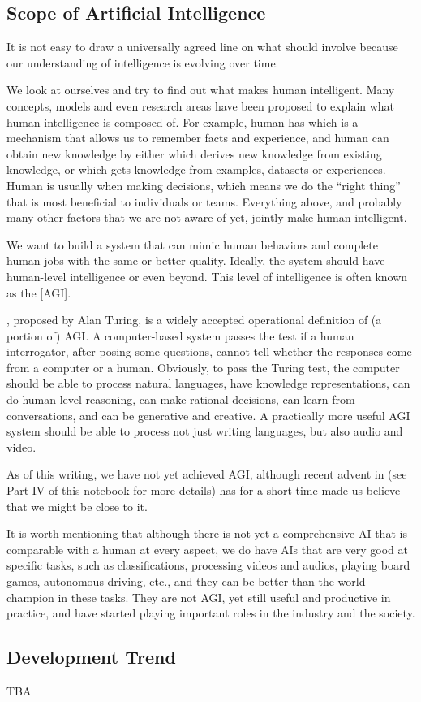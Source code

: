 \subsection{Scope of Artificial Intelligence}

It is not easy to draw a universally agreed line on what  should involve because our understanding of intelligence is evolving over time. 

We look at ourselves and try to find out what makes human intelligent. Many concepts, models and even research areas have been proposed to explain what human intelligence is composed of. For example, human has  which is a mechanism that allows us to remember facts and experience, and human can obtain new knowledge by either  which derives new knowledge from existing knowledge, or  which gets knowledge from examples, datasets or experiences. Human is usually  when making decisions, which means we do the ``right thing'' that is most beneficial to individuals or teams. Everything above, and probably many other factors that we are not aware of yet, jointly make human intelligent.

We want to build a system that can mimic human behaviors and complete human jobs with the same or better quality. Ideally, the system should have human-level intelligence or even beyond. This level of intelligence is often known as the [AGI]. 

, proposed by Alan Turing, is a widely accepted operational definition of (a portion of) AGI. A computer-based system passes the test if a human interrogator, after posing some questions, cannot tell whether the responses come from a computer or a human. Obviously, to pass the Turing test, the computer should be able to process natural languages, have knowledge representations, can do human-level reasoning, can make rational decisions, can learn from conversations, and can be generative and creative. A practically more useful AGI system should be able to process not just writing languages, but also audio and video.

As of this writing, we have not yet achieved AGI, although recent advent in  (see Part IV of this notebook for more details) has for a short time made us believe that we might be close to it.

It is worth mentioning that although there is not yet a comprehensive AI that is comparable with a human at every aspect, we do have AIs that are very good at specific tasks, such as classifications, processing videos and audios, playing board games, autonomous driving, etc., and they can be better than the world champion in these tasks. They are not AGI, yet still useful and productive in practice, and have started playing important roles in the industry and the society.

\subsection{Development Trend}

TBA